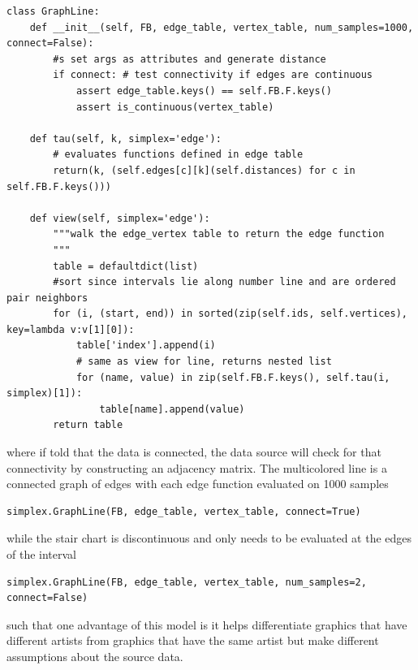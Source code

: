 \documentclass[../main.tex]{subfiles}
\begin{document}
\begin{verbatim}
class GraphLine:
    def __init__(self, FB, edge_table, vertex_table, num_samples=1000, connect=False):
        #s set args as attributes and generate distance
        if connect: # test connectivity if edges are continuous
            assert edge_table.keys() == self.FB.F.keys()
            assert is_continuous(vertex_table)

    def tau(self, k, simplex='edge'):
        # evaluates functions defined in edge table
        return(k, (self.edges[c][k](self.distances) for c in self.FB.F.keys()))

    def view(self, simplex='edge'):
        """walk the edge_vertex table to return the edge function
        """
        table = defaultdict(list)
        #sort since intervals lie along number line and are ordered pair neighbors
        for (i, (start, end)) in sorted(zip(self.ids, self.vertices), key=lambda v:v[1][0]):
            table['index'].append(i)
            # same as view for line, returns nested list
            for (name, value) in zip(self.FB.F.keys(), self.tau(i, simplex)[1]):
                table[name].append(value)
        return table
\end{verbatim}
where if told that the data is connected, the data source will check for that connectivity by constructing an adjacency matrix. The multicolored line is a connected graph of edges with each edge function evaluated on 1000 samples 
\begin{verbatim}
simplex.GraphLine(FB, edge_table, vertex_table, connect=True)
\end{verbatim}
while the stair chart is discontinuous and only needs to be evaluated at the edges of the interval 
\begin{verbatim}
simplex.GraphLine(FB, edge_table, vertex_table, num_samples=2, connect=False)
\end{verbatim}
such that one advantage of this model is it helps differentiate graphics that have different artists from graphics that have the same artist but make different assumptions about the source data. 
\end{document}

